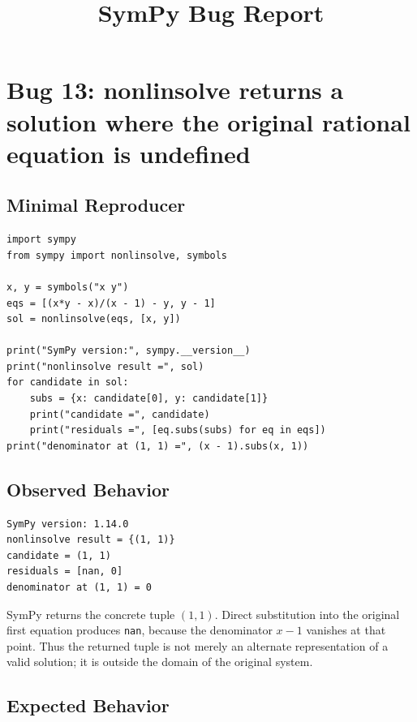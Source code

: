 \documentclass[11pt]{article}
\title{SymPy Bug Report}
\author{}
\date{}
\begin{document}
\maketitle

\section{Bug 13: nonlinsolve returns a solution where the original rational equation is undefined}

\subsection{Minimal Reproducer}

\medskip

\begin{lstlisting}[style=bugpython]
import sympy
from sympy import nonlinsolve, symbols

x, y = symbols("x y")
eqs = [(x*y - x)/(x - 1) - y, y - 1]
sol = nonlinsolve(eqs, [x, y])

print("SymPy version:", sympy.__version__)
print("nonlinsolve result =", sol)
for candidate in sol:
    subs = {x: candidate[0], y: candidate[1]}
    print("candidate =", candidate)
    print("residuals =", [eq.subs(subs) for eq in eqs])
print("denominator at (1, 1) =", (x - 1).subs(x, 1))
\end{lstlisting}

\subsection{Observed Behavior}

\medskip

\begin{lstlisting}[style=bugpython]
SymPy version: 1.14.0
nonlinsolve result = {(1, 1)}
candidate = (1, 1)
residuals = [nan, 0]
denominator at (1, 1) = 0
\end{lstlisting}

SymPy returns the concrete tuple \((1,1)\).  Direct substitution into the original first equation produces \texttt{nan}, because the denominator \(x-1\) vanishes at that point.  Thus the returned tuple is not merely an alternate representation of a valid solution; it is outside the domain of the original system.

\subsection{Expected Behavior}
\end{document}
